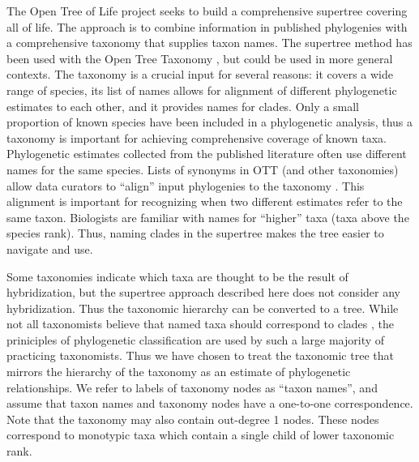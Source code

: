 \documentclass[english]{article}
\begin{document}
The Open Tree of Life project \citep{HinchliffEtAl2015} seeks to build a
comprehensive supertree \citep[see][]{redelings2017supertree} covering all of
life. The approach is to combine information in published phylogenies with a
comprehensive taxonomy that supplies taxon names. The supertree method has
been used with the Open Tree Taxonomy \citep[OTT hereafter, see][]{rees2017automated},
but could be used in more general contexts. The taxonomy is a crucial input for
several reasons: it covers a wide range of species, its list of names allows
for alignment of different phylogenetic estimates to each other, and it provides
names for clades. Only a small proportion of known species have been included in
a phylogenetic analysis, thus a taxonomy is important for achieving
comprehensive coverage of known taxa. Phylogenetic estimates collected from the
published literature often use different names for the same species. Lists of
synonyms in OTT (and other taxonomies) allow data curators to ``align'' input
phylogenies to the taxonomy \citep[see][ for discussion of the curation process
that the Open Tree of Life project uses to align phylogenetic estimates to OTT]{McTavishEtAt2015}.
This alignment is important for recognizing when two different estimates refer
to the same taxon. Biologists are familiar with names for ``higher'' taxa (taxa
above the species rank). Thus, naming clades in the supertree makes the tree
easier to navigate and use.

Some taxonomies indicate which taxa are thought to be the result of
hybridization, but the supertree approach described here does not consider any
hybridization. Thus the taxonomic hierarchy can be converted to a tree. While
not all taxonomists believe that named taxa should correspond to clades \citep[see,
for example,][]{HorandlS2010}, the priniciples of phylogenetic classification
are used by such a large majority of practicing taxonomists.
Thus we have chosen
to treat the taxonomic tree that mirrors the hierarchy of the taxonomy as an
estimate of phylogenetic relationships. We refer to labels of taxonomy nodes as
``taxon names'', and assume that taxon names and taxonomy nodes have a
one-to-one correspondence. Note that the taxonomy may also contain out-degree
1 nodes. These nodes correspond to monotypic taxa which contain a single child
of lower taxonomic rank.
\end{document}
